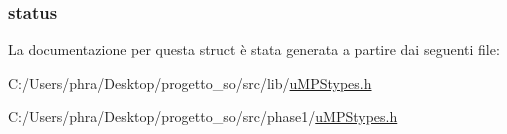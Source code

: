 \hypertarget{structstate__t_ae37efb991e613c0dc476ece5ed4ffa71}{
\subsubsection[{status}]{ status}}\label{structstate__t_ae37efb991e613c0dc476ece5ed4ffa71}


La documentazione per questa struct è stata generata a partire dai seguenti file\-:\begin{DoxyCompactItemize}
\item 
C\-:/\-Users/phra/\-Desktop/progetto\-\_\-so/src/lib/\hyperlink{lib_2u_m_p_stypes_8h}{u\-M\-P\-Stypes.\-h}\item 
C\-:/\-Users/phra/\-Desktop/progetto\-\_\-so/src/phase1/\hyperlink{phase1_2u_m_p_stypes_8h}{u\-M\-P\-Stypes.\-h}\end{DoxyCompactItemize}
